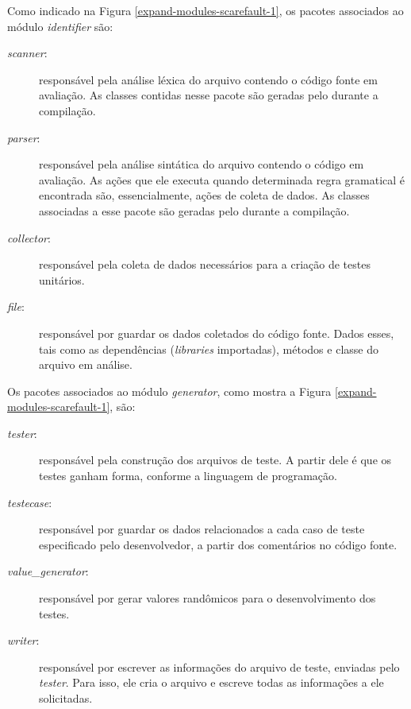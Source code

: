 Como indicado na Figura \ref{expand-modules-scarefault-1}, os pacotes associados ao
módulo \textit{identifier} são:
\begin{description}
\item[\textit{scanner}:] responsável pela análise léxica do arquivo contendo o código
fonte em avaliação. As classes contidas nesse pacote são geradas pelo \flexcpp durante
a compilação.
\item[\textit{parser}:] responsável pela análise sintática do arquivo contendo o
código em avaliação. As ações que ele executa quando determinada regra gramatical é
encontrada são, essencialmente, ações de coleta de dados. As classes associadas
a esse pacote são geradas pelo \bisoncpp durante a compilação.
\item[\textit{collector}:] responsável pela coleta de dados necessários para a
criação de testes unitários.
\item[\textit{file}:] responsável por guardar os dados coletados do código fonte.
Dados esses, tais como as dependências (\textit{libraries} importadas), métodos e classe
do arquivo em análise.
\end{description}

Os pacotes associados ao módulo \textit{generator}, como mostra a Figura
\ref{expand-modules-scarefault-1}, são:
\begin{description}
\item[	\textit{tester}:] responsável pela construção dos arquivos de teste. A partir
dele é que os testes ganham forma, conforme a linguagem de programação.
\item[	\textit{testecase}:] responsável por guardar os dados relacionados
a cada caso de teste especificado pelo desenvolvedor, a partir dos
comentários no código fonte.
\item[	\textit{value\_generator}:] responsável por gerar valores randômicos
para o desenvolvimento dos testes.
\item[\textit{writer}:] responsável por escrever as informações do arquivo de
teste, enviadas pelo \textit{tester}. Para isso, ele cria o arquivo e
escreve todas as informações a ele solicitadas.
\end{description}

